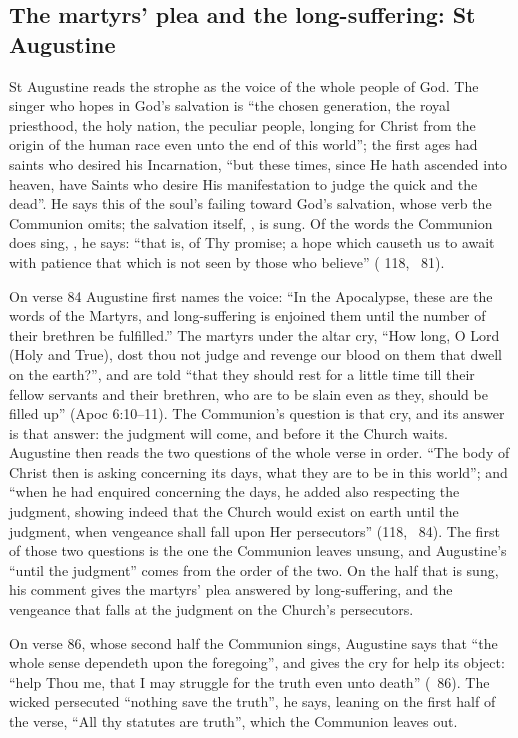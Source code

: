 \subsection{The martyrs' plea and the long-suffering: St Augustine}

St Augustine reads the strophe as the voice of the whole people of God. The
singer who hopes in God's salvation is ``the chosen generation, the royal
priesthood, the holy nation, the peculiar people, longing for Christ from the
origin of the human race even unto the end of this world''; the first ages had
saints who desired his Incarnation, ``but these times, since He hath ascended
into heaven, have Saints who desire His manifestation to judge the quick and the
dead''. He says this of the soul's failing toward God's salvation, whose verb the
Communion omits; the salvation itself, , is sung. Of the
words the Communion does sing, , he says: ``that
is, of Thy promise; a hope which causeth us to await with patience that which is
not seen by those who believe'' ( 118, ~81).

On verse 84 Augustine first names the voice: ``In the Apocalypse, these are the
words of the Martyrs, and long-suffering is enjoined them until the number of
their brethren be fulfilled.'' The martyrs under the altar cry, ``How long, O Lord
(Holy and True), dost thou not judge and revenge our blood on them that dwell on
the earth?'', and are told ``that they should rest for a little time till their
fellow servants and their brethren, who are to be slain even as they, should be
filled up'' (Apoc 6:10--11). The Communion's question is that cry, and its answer
is that answer: the judgment will come, and before it the Church waits. Augustine
then reads the two questions of the whole verse in order. ``The body of Christ
then is asking concerning its days, what they are to be in this world''; and
``when he had enquired concerning the days, he added also respecting the
judgment, showing indeed that the Church would exist on earth until the judgment,
when vengeance shall fall upon Her persecutors'' (118, ~84). The first
of those two questions is the one the Communion leaves unsung, and Augustine's
``until the judgment'' comes from the order of the two. On the half that is sung,
his comment gives the martyrs' plea answered by long-suffering, and the vengeance
that falls at the judgment on the Church's persecutors.

On verse 86, whose second half the Communion sings, Augustine says that ``the
whole sense dependeth upon the foregoing'', and gives the cry for help its
object: ``help Thou me, that I may struggle for the truth even unto death''
(~86). The wicked persecuted ``nothing save the truth'', he says,
leaning on the first half of the verse, ``All thy statutes are truth'', which the
Communion leaves out.

